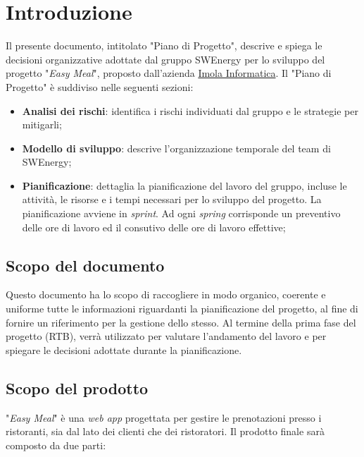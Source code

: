 \section{Introduzione}

Il presente documento, intitolato "Piano di Progetto", descrive e spiega le
decisioni organizzative adottate dal gruppo SWEnergy per lo sviluppo del
progetto "\textit{Easy Meal}", proposto dall'azienda
\href{https://imolainformatica.it/}{Imola Informatica}. Il "Piano di Progetto" è
suddiviso nelle seguenti sezioni:

\begin{itemize}
	\item \textbf{Analisi dei rischi}: identifica i rischi individuati dal
	      gruppo e le strategie per mitigarli;

	\item \textbf{Modello di sviluppo}: descrive l'organizzazione temporale del
	      team di SWEnergy;

	\item \textbf{Pianificazione}: dettaglia la pianificazione del lavoro del
	      gruppo, incluse le attività, le risorse e i tempi necessari per lo
	      sviluppo del progetto. La pianificazione avviene in \textit{sprint}.
	      Ad ogni \textit{spring} corrisponde un preventivo delle ore di
	      lavoro ed il consutivo delle ore di lavoro effettive;
\end{itemize}

\subsection{Scopo del documento}

Questo documento ha lo scopo di raccogliere in modo organico, coerente e
uniforme tutte le informazioni riguardanti la pianificazione del progetto, al
fine di fornire un riferimento per la gestione dello stesso. Al termine della
prima fase del progetto (RTB), verrà utilizzato per valutare l'andamento del
lavoro e per spiegare le decisioni adottate durante la pianificazione.

\subsection{Scopo del prodotto}

"\textit{Easy Meal}" è una \textit{web app} progettata per gestire le
prenotazioni presso i ristoranti, sia dal lato dei clienti che dei ristoratori.
Il prodotto finale sarà composto da due parti:

